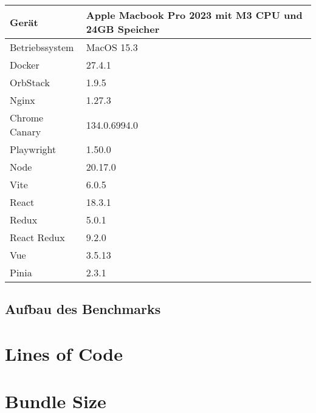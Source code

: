 \begin{center}
  \begin{tabular}{ | m{5cm}| m{5cm} | } 
    \hline
    Gerät & Apple Macbook Pro 2023 mit M3 CPU und 24GB Speicher \\ 
    \hline
    Betriebssystem & MacOS 15.3 \\ 
    \hline
    Docker & 27.4.1 \\ 
    \hline
    OrbStack & 1.9.5 \\ 
    \hline
    Nginx & 1.27.3 \\ 
    \hline
    Chrome Canary & 134.0.6994.0 \\ 
    \hline
    Playwright & 1.50.0 \\ 
    \hline
    Node & 20.17.0 \\ 
    \hline
    Vite & 6.0.5 \\ 
    \hline
    React & 18.3.1 \\ 
    \hline
    Redux & 5.0.1 \\ 
    \hline
    React Redux & 9.2.0 \\ 
    \hline
    Vue & 3.5.13 \\ 
    \hline
    Pinia & 2.3.1 \\ 
    \hline
  \end{tabular}
\end{center}

\subsection{Aufbau des Benchmarks}




% 

\section{Lines of Code}

\section{Bundle Size}

